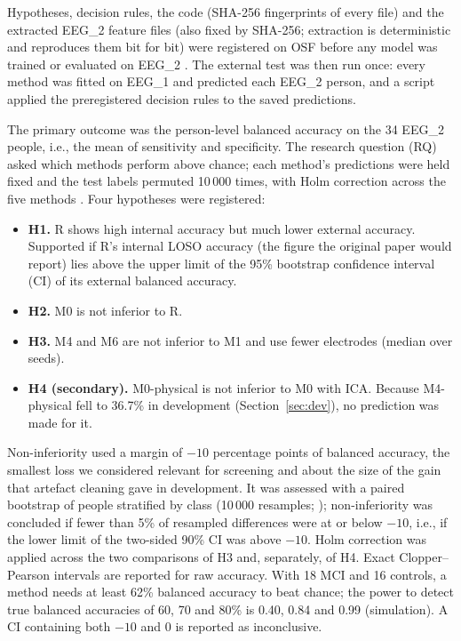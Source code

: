 Hypotheses, decision rules, the code (SHA-256 fingerprints of every file) and the extracted EEG\_2 feature files (also fixed by SHA-256; extraction is deterministic and reproduces them bit for bit) were registered on OSF before any model was trained or evaluated on EEG\_2 \citep{osfprereg}. The external test was then run once: every method was fitted on EEG\_1 and predicted each EEG\_2 person, and a script applied the preregistered decision rules to the saved predictions.

The primary outcome was the person-level balanced accuracy on the 34 EEG\_2 people, i.e., the mean of sensitivity and specificity. The research question (RQ) asked which methods perform above chance; each method's predictions were held fixed and the test labels permuted 10\,000 times, with Holm correction across the five methods \citep{holm1979}. Four hypotheses were registered:
\begin{itemize}[leftmargin=*,itemsep=1pt]
\item \textbf{H1.} R shows high internal accuracy but much lower external accuracy. Supported if R's internal LOSO accuracy (the figure the original paper would report) lies above the upper limit of the 95\% bootstrap confidence interval (CI) of its external balanced accuracy.
\item \textbf{H2.} M0 is not inferior to R.
\item \textbf{H3.} M4 and M6 are not inferior to M1 and use fewer electrodes (median over seeds).
\item \textbf{H4 (secondary).} M0-physical is not inferior to M0 with ICA. Because M4-physical fell to 36.7\% in development (Section~\ref{sec:dev}), no prediction was made for it.
\end{itemize}
Non-inferiority \citep{walker2011} used a margin of $-10$ percentage points of balanced accuracy, the smallest loss we considered relevant for screening and about the size of the gain that artefact cleaning gave in development. It was assessed with a paired bootstrap of people stratified by class (10\,000 resamples; \citealp{efron1993}); non-inferiority was concluded if fewer than 5\% of resampled differences were at or below $-10$, i.e., if the lower limit of the two-sided 90\% CI was above $-10$. Holm correction was applied across the two comparisons of H3 and, separately, of H4. Exact Clopper--Pearson intervals \citep{clopper1934} are reported for raw accuracy. With 18 MCI and 16 controls, a method needs at least 62\% balanced accuracy to beat chance; the power to detect true balanced accuracies of 60, 70 and 80\% is 0.40, 0.84 and 0.99 (simulation). A CI containing both $-10$ and 0 is reported as inconclusive.

